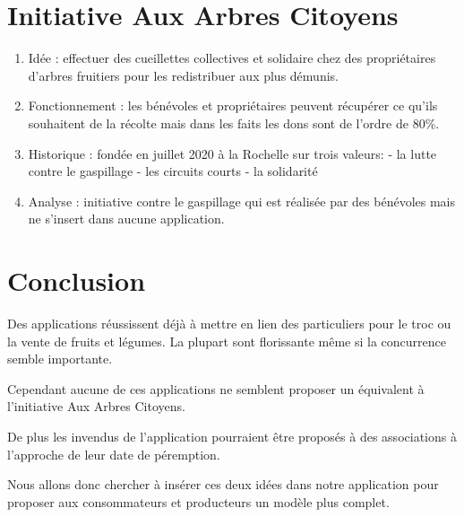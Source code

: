 \documentclass{article}
\begin{document}
\section{Initiative Aux Arbres Citoyens}
\begin{enumerate}
    \item Idée : effectuer des cueillettes collectives et solidaire
    chez des propriétaires d'arbres fruitiers pour les redistribuer
    aux plus démunis.
    \item Fonctionnement : les bénévoles et propriétaires peuvent récupérer
    ce qu'ils souhaitent de la récolte mais dans les faits les dons sont
    de l'ordre de 80\%.
    \item Historique : fondée en juillet 2020 à la Rochelle sur trois
    valeurs: - la lutte contre le gaspillage
             - les circuits courts
             - la solidarité
    \item Analyse : initiative contre le gaspillage qui est réalisée par
    des bénévoles mais ne s'insert dans aucune application.
\end{enumerate}

\section{Conclusion}

Des applications réussissent déjà à mettre en lien des particuliers pour
le troc ou la vente de fruits et légumes. La plupart sont florissante même 
si la concurrence semble importante.

Cependant aucune de ces applications ne semblent proposer un équivalent à l'initiative Aux Arbres Citoyens.


De plus les invendus de l'application pourraient être proposés à des 
associations à l'approche de leur date de péremption.


Nous allons donc chercher à insérer ces deux idées dans notre application
pour proposer aux consommateurs et producteurs un modèle plus complet.
\end{document}
